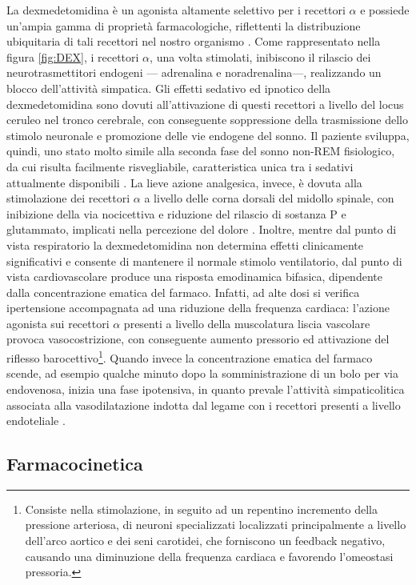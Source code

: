 La dexmedetomidina è un agonista altamente selettivo per i recettori $\alpha$ e possiede un'ampia gamma di proprietà farmacologiche, riflettenti la distribuzione ubiquitaria di tali recettori nel nostro organismo \cite{Keating2015}. Come rappresentato nella figura \ref{fig:DEX}, i recettori $\alpha$, una volta stimolati, inibiscono il rilascio dei neurotrasmettitori endogeni --- adrenalina e noradrenalina---, realizzando un blocco dell'attività simpatica. Gli effetti sedativo ed ipnotico della dexmedetomidina sono dovuti all'attivazione di questi recettori a livello del locus ceruleo nel tronco cerebrale, con conseguente soppressione della trasmissione dello stimolo neuronale e promozione delle vie endogene del sonno. Il paziente sviluppa, quindi, uno stato molto simile alla seconda fase del sonno non-REM fisiologico, da cui risulta facilmente risvegliabile, caratteristica unica tra i sedativi attualmente disponibili \cite{Weerink2017, Gertler2001}.
La lieve azione analgesica, invece, è dovuta alla stimolazione dei recettori $\alpha$ a livello delle corna dorsali del midollo spinale, con inibizione della via nocicettiva e riduzione del rilascio di sostanza P e glutammato, implicati nella percezione del dolore \cite{Weerink2017}. Inoltre, mentre dal punto di vista respiratorio la dexmedetomidina non determina effetti clinicamente significativi e consente di mantenere il normale stimolo ventilatorio, dal punto di vista cardiovascolare produce una risposta emodinamica bifasica, dipendente dalla concentrazione ematica del farmaco. Infatti, ad alte dosi si verifica ipertensione accompagnata ad una riduzione della frequenza cardiaca: l'azione agonista sui recettori $\alpha$ presenti a livello della muscolatura liscia vascolare provoca vasocostrizione, con conseguente aumento pressorio ed attivazione del riflesso barocettivo\footnote{Consiste nella stimolazione, in seguito ad un repentino incremento della pressione arteriosa, di neuroni specializzati localizzati principalmente a livello dell'arco aortico e dei seni carotidei, che forniscono un feedback negativo, causando una diminuzione della frequenza cardiaca e favorendo l'omeostasi pressoria.}. Quando invece la concentrazione ematica del farmaco scende, ad esempio qualche minuto dopo la somministrazione di un bolo per via endovenosa, inizia una fase ipotensiva, in quanto prevale l'attività simpaticolitica associata alla vasodilatazione indotta dal legame con i recettori presenti a livello endoteliale \cite{Weerink2017}. 

\subsection*{Farmacocinetica}

